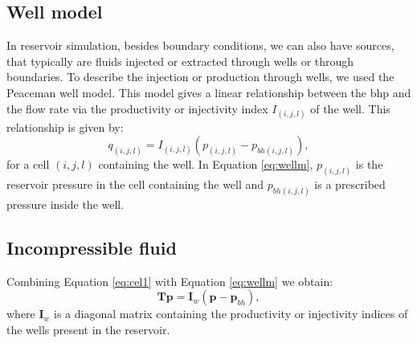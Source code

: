 \documentclass{article}
\begin{document}
\subsection*{Well model}
\hspace{0.5cm}In reservoir simulation, besides boundary conditions, we can also have sources, that typically are fluids injected or extracted through wells or through boundaries. 
To describe the injection or production through wells, we used the Peaceman well model. This model gives a linear relationship between the bhp and the flow rate via the productivity or injectivity index ${I}_{(i,j,l)}$ of the well. This relationship is given by: 
\begin{equation}\label{eq:wellm}
{q}_{(i,j,l)}={I}_{(i,j,l)}({p}_{(i,j,l)}-{p}_{bh(i,j,l)}),
\end{equation}
for a cell $(i,j,l)$ containing the well. In Equation \eqref{eq:wellm}, ${p}_{(i,j,l)}$ is the reservoir pressure in the cell containing the well
and ${p}_{bh(i,j,l)}$ is a prescribed pressure inside the well.
\subsection*{Incompressible fluid}
\hspace{0.5cm}Combining Equation \eqref{eq:cel1} with Equation \eqref{eq:wellm} we obtain:
 \begin{equation}\label{eq:celw1}
\mathbf{T}\mathbf{p} = \mathbf{I}_w(\mathbf{p}-\mathbf{p}_{bh}),
\end{equation}
where $\mathbf{I}_w$ is a diagonal matrix containing the productivity or injectivity indices of the wells present in the reservoir. 
 

% 

 
 
 
% 
\newpage
\newpage

% 
% 
% 
% 
\end{document}
